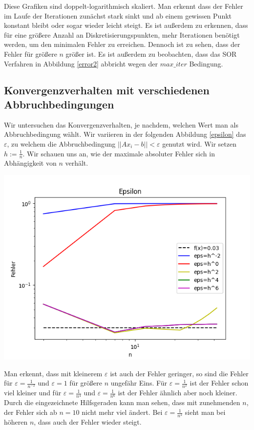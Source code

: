 \documentclass[smallheadings]{scrartcl}
\theoremstyle{definition}
\begin{document}
 Diese Grafiken sind doppelt-logarithmisch skaliert.  Man erkennt dass der Fehler im Laufe der Iterationen zunächst stark sinkt und ab einem gewissen Punkt konstant bleibt oder sogar wieder leicht steigt.  Es ist außerdem zu erkennen, dass für eine größere Anzahl an Diskretisierungspunkten, mehr Iterationen benötigt werden, um den minimalen Fehler zu erreichen. Dennoch ist zu sehen, dass der Fehler für größere $n$ größer ist. 
Es ist außerdem zu beobachten, dass das SOR Verfahren in Abbildung \ref{error2} abbricht wegen der $max\_iter$ Bedingung.

\subsection{Konvergenzverhalten mit verschiedenen Abbruchbedingungen}
Wir untersuchen das Konvergenzverhalten, je nachdem, welchen Wert man als Abbruchbedingung wählt.  Wir variieren in der folgenden Abbildung \ref{epsilon} das $\varepsilon$,  zu welchem die Abbruchbedingung $||Ax_i -b||<\varepsilon$ genutzt wird. Wir setzen $h:=\frac{1}{n}$. Wir schauen uns an, wie der maximale absoluter Fehler sich in Abhängigkeit von $n$ verhält. 


\begin{minipage}{\textwidth}

 \centering
 \includegraphics[scale = 0.9]{epsilon1}
 	\label{epsilon}

 \end{minipage}
 
 Man erkennt, dass mit kleinerem $\varepsilon$ ist auch der Fehler geringer, so sind die Fehler für $\varepsilon =\frac{1}{n^{-2}}$ und $\varepsilon =1$ für größere $n$ ungefähr Eins.    Für $\varepsilon =\frac{1}{n^{2}}$ ist der Fehler schon viel kleiner und für  $\varepsilon =\frac{1}{n^{4}}$ und  $\varepsilon =\frac{1}{n^{6}}$ ist der Fehler ähnlich aber noch kleiner.  Durch die eingezeichnete Hilfsgeraden kann man sehen, dass mit zunehmenden $n$, der Fehler sich ab $n=10$ nicht mehr viel ändert.  Bei $\varepsilon = \frac{1}{n^{2}}$ sieht man bei höheren $n$, dass auch der Fehler wieder steigt.
\end{document}
